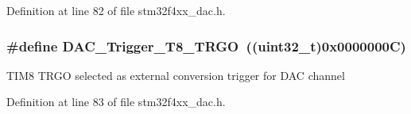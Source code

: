 Definition at line 82 of file stm32f4xx\-\_\-dac.\-h.

\hypertarget{group___d_a_c__trigger__selection_ga756700c6621eadb807e21a16966580a0}{
\subsubsection[{D\-A\-C\-\_\-\-Trigger\-\_\-\-T8\-\_\-\-T\-R\-G\-O}]{\setlength{\rightskip}{0pt plus 5cm}\#define D\-A\-C\-\_\-\-Trigger\-\_\-\-T8\-\_\-\-T\-R\-G\-O~((uint32\-\_\-t)0x0000000\-C)}}\label{group___d_a_c__trigger__selection_ga756700c6621eadb807e21a16966580a0}
T\-I\-M8 T\-R\-G\-O selected as external conversion trigger for D\-A\-C channel 

Definition at line 83 of file stm32f4xx\-\_\-dac.\-h.

